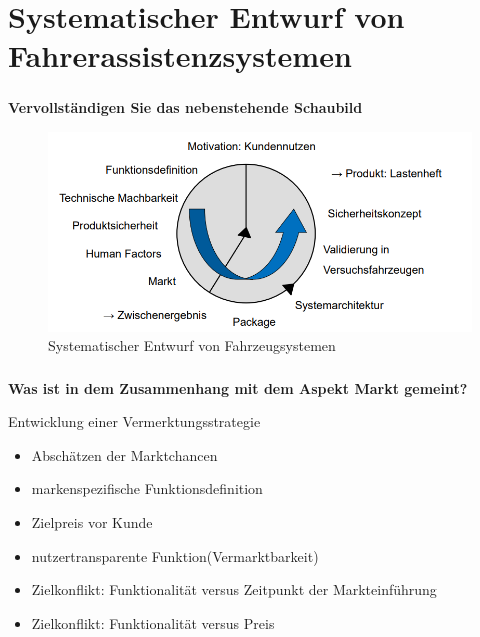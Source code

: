 \setcounter{section}{0}
\part{Systematischer Entwurf von Fahrerassistenzsystemen}
\section{}
\textbf{Vervollständigen Sie das nebenstehende Schaubild}
\begin{figure}[H]
    \centering
    \includegraphics[width=.8\linewidth]{Graphics/systematischer_Entwurf.png}
    \caption{Systematischer Entwurf von Fahrzeugsystemen}
\end{figure}
\section{}
\textbf{Was ist in dem Zusammenhang mit dem Aspekt Markt gemeint?}

Entwicklung einer Vermerktungsstrategie
\begin{itemize}
    \item Abschätzen der Marktchancen
    \item markenspezifische Funktionsdefinition
    \item Zielpreis vor Kunde
    \item nutzertransparente Funktion(Vermarktbarkeit)
    \item Zielkonflikt: Funktionalität versus Zeitpunkt der Markteinführung
    \item Zielkonflikt: Funktionalität versus Preis
\end{itemize}